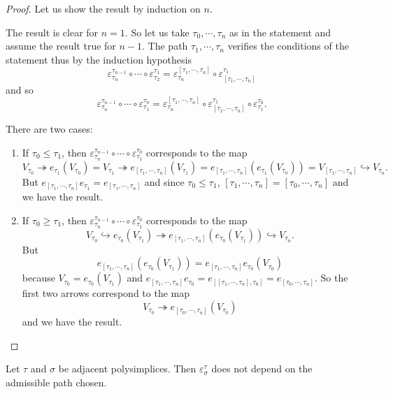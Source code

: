 \documentclass[a4paper,10pt]{amsart}
\begin{document}
\begin{proof}
Let us show the result by induction on $n$.

The result is clear for $n=1$. So let us take $\tau_{0},\cdots,\tau_{n}$ as in the statement and assume the result true for $n-1$. The path $\tau_{1},\cdots,\tau_{n}$ verifies the conditions of the statement thus by the induction hypothesis
\[ \varepsilon^{\tau_{n-1}}_{\tau_{n}} \circ \cdots \circ \varepsilon_{\tau_{2}}^{\tau_{1}} = \varepsilon^{[\tau_{1},\cdots,\tau_{n}]}_{\tau_{n}} \circ \varepsilon_{[\tau_{1},\cdots,\tau_{n}]}^{\tau_{1}}\]
and so
\[\varepsilon^{\tau_{n-1}}_{\tau_{n}} \circ \cdots \circ \varepsilon_{\tau_{1}}^{\tau_{0}} = \varepsilon^{[\tau_{1},\cdots,\tau_{n}]}_{\tau_{n}} \circ \varepsilon_{[\tau_{1},\cdots,\tau_{n}]}^{\tau_{1}} \circ \varepsilon_{\tau_{1}}^{\tau_{0}}.\]

There are two cases:
\begin{enumerate}
\item If $\tau_{0} \leq \tau_{1}$, then $\varepsilon^{\tau_{n-1}}_{\tau_{n}} \circ \cdots \circ \varepsilon_{\tau_{1}}^{\tau_{0}}$ corresponds to the map
\[ V_{\tau_{0}} \twoheadrightarrow e_{\tau_{1}}(V_{\tau_{0}})=V_{\tau_{1}} \twoheadrightarrow e_{[\tau_{1},\cdots,\tau_{n}]}(V_{\tau_{1}})=e_{[\tau_{1},\cdots,\tau_{n}]}( e_{\tau_{1}}(V_{\tau_{0}}))=V_{[\tau_{1},\cdots,\tau_{n}]} \hookrightarrow V_{\tau_{n}}.\]
But $e_{[\tau_{1},\cdots,\tau_{n}]} e_{\tau_{1}}=e_{[\tau_{1},\cdots,\tau_{n}]}$ and since $\tau_{0} \leq \tau_{1}$, $[\tau_{1},\cdots,\tau_{n}]=[\tau_{0},\cdots,\tau_{n}]$ and we have the result.
\item If $\tau_{0} \geq \tau_{1}$, then $\varepsilon^{\tau_{n-1}}_{\tau_{n}} \circ \cdots \circ \varepsilon_{\tau_{1}}^{\tau_{0}}$ corresponds to the map
\[ V_{\tau_{0}} \hookrightarrow e_{\tau_{0}}(V_{\tau_{1}}) \twoheadrightarrow e_{[\tau_{1},\cdots,\tau_{n}]}( e_{\tau_{0}}(V_{\tau_{1}}))\hookrightarrow V_{\tau_{n}}.\]
But
\[e_{[\tau_{1},\cdots,\tau_{n}]}( e_{\tau_{0}}(V_{\tau_{1}}))=e_{[\tau_{1},\cdots,\tau_{n}]} e_{\tau_{0}}(V_{\tau_{0}})\]
because $V_{\tau_{0}}=e_{\tau_{0}}(V_{\tau_{1}})$ and $e_{[\tau_{1},\cdots,\tau_{n}]} e_{\tau_{0}} = e_{[[\tau_{1},\cdots,\tau_{n}],\tau_{0}]} = e_{[\tau_{0},\cdots,\tau_{n}]}$. So the first two arrows correspond to the map
\[V_{\tau_{0}} \twoheadrightarrow e_{[\tau_{0},\cdots,\tau_{n}]}( V_{\tau_{0}})\]
and we have the result.
\end{enumerate}
\end{proof}

\begin{Cor}
\label{coradjacent}
Let $\tau$ and $\sigma$ be adjacent polysimplices. Then $ \varepsilon_{\sigma}^{\tau}$ does not depend on the admissible path chosen.
\end{Cor}
\end{document}
